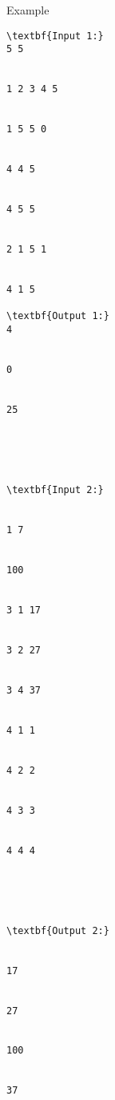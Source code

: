 Example
\begin{verbatim}
\textbf{Input 1:}
5 5 


1 2 3 4 5 


1 5 5 0 


4 4 5 


4 5 5 


2 1 5 1 


4 1 5

\textbf{Output 1:}
4


0


25 





\textbf{Input 2:}


1 7 


100 


3 1 17 


3 2 27 


3 4 37 


4 1 1 


4 2 2 


4 3 3 


4 4 4





\textbf{Output 2:}


17 


27 


100


37


\end{verbatim}